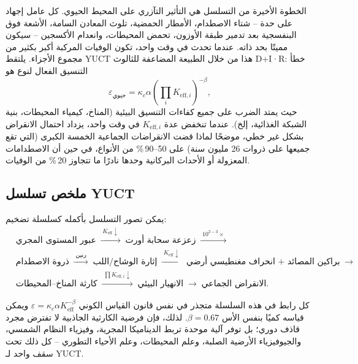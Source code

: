 \documentclass[11pt,a4paper]{article}
\begin{document}
	الخطوة الأخيرة من التسلسل هي التأثير التآزري على المحيط الحيوي. 
	كل عامل إجهاد على حدة – شتاء الاصطدام، الأمطار الحمضية، تلوث المعادن السامة، الأشعة فوق البنفسجية بعد تدمير طبقة الأوزون، تحمض المحيطات، وانعدام الأكسجين – سيكون مميتًا بحد ذاته. عندما تحدث في وقت واحد، تكون الوفيات المركبة أكبر بكثير من مجموع الأجزاء. 
	يلتقط YUCT هذا من خلال الطبيعة المضاعفة للثالوث D+I·R: خطأ التنسيق الفعال لنوع هو
	\[
	\varepsilon_{\text{حيوي}} = \kappa_c \alpha \left( \prod_{i} K_{\mathrm{eff},i} \right)^{-\beta},
	\]
	حيث يمتد الضرب على جميع كفاءات التنسيق البيئية (المناخ، كيمياء المحيطات، بنية الشبكة الغذائية، إلخ). عندما تنخفض عدة \(K_{\mathrm{eff},i}\) في وقت واحد، يزداد احتمال الانقراض بشكل غير خطي، موضحًا لماذا قضت الانقراضات الجماعية الخمسة الكبرى (التي تقع جميعها على ذروات 26 مليون سنة) على 50–90 \% من الأنواع، في حين أن الاصطدامات المعزولة أو الأحداث البركانية وحدها نادرًا ما تتجاوز 20 \% من الوفيات.
	
	\subsection{ملخص تسلسل YUCT}
	
	يمكن تصور التسلسل بأكمله كسلسلة تضخيم:
	{\small
		\[
		\begin{aligned}
			&\text{عبور المستوى المجري}
			\;\xrightarrow{\;K_{\mathrm{eff}}\downarrow\;}\;
			\text{زعزعة سحابة أورت}
			\;\xrightarrow{\;10^{2-3}\times\;}\\
			&\text{ذروة الاصطدام}
			\;\xrightarrow{\;\text{رنين}\;}\;
			\text{إثارة الوشاح/اللب}
			\;\xrightarrow{\;K_{\mathrm{eff}}\downarrow\;}\;
			\text{براكين المصائد + انحراف مغنطيسي أرضي}
			\;\xrightarrow{\;}\\
			&\text{كارثة المناخ–المحيطات}
			\;\xrightarrow{\;\prod K_{\mathrm{eff},i}\downarrow\;}\;
			\text{الانهيار البيئي}
			\;\xrightarrow{\;}\;
			\text{الانقراض الجماعي}.
		\end{aligned}
		\]
	}
	
	كل رابط في هذه السلسلة متجذر في نفس قانون القياس الكوني \(\varepsilon = \kappa_c \alpha K_{\mathrm{eff}}^{-\beta}\) ويمكن قياسه كميًا بنفس الأس \(\beta = 0.67\). لذلك، فإن فرضية الكارثية الجاذبية لا تفترض مجرد قاذف دوري؛ بل توفر آلية موحدة تربط الديناميكا المجرية، وفيزياء النظام الشمسي، والجيوفيزياء الأرضية الصلبة، وعلم المحيطات، وعلم الأحياء التطوري – كل ذلك تحت سقف واحد لـ YUCT.
	
\end{document}
